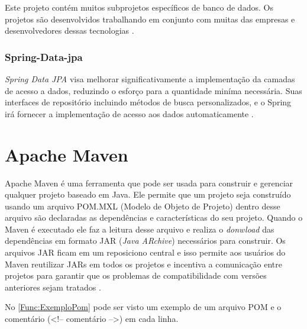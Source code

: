 Este projeto contém muitos subprojetos específicos de banco de dados. Os projetos são desenvolvidos trabalhando em conjunto com muitas das empresas e desenvolvedores dessas tecnologias \cite{springData:2017}.


\subsubsection{Spring-Data-jpa}\label{subsubsec:SpringDatajpa}

\textit{Spring Data JPA} visa melhorar significativamente a implementação da camadas de acesso a dados, reduzindo o esforço para a quantidade miníma necessária. Suas interfaces de repositório incluindo métodos de busca personalizados, e o Spring irá fornecer a implementação de acesso aos dados automaticamente \cite{springDataJpa:2017}.



\section{Apache Maven}\label{sec:ApacheMaven}

Apache Maven é uma ferramenta que pode ser usada para construir e gerenciar qualquer projeto baseado em Java. Ele permite que um projeto seja construído usando um arquivo POM.MXL (Modelo de Objeto de Projeto) dentro desse arquivo são declaradas as dependências e características do seu projeto. Quando o Maven é executado ele faz a leitura desse arquivo e realiza o \textit{donwload} das dependências em formato JAR (\textit{Java ARchive}) necessários para construir. Os arquivos JAR ficam em um reposiciono central e isso permite aos usuários do Maven reutilizar JARs em todos os projetos e incentiva a comunicação entre projetos para garantir que os problemas de compatibilidade com versões anteriores sejam tratados \cite{ApacheFeature:2017}.


No \autoref{Func:ExemploPom} pode ser visto um exemplo de um arquivo POM e o comentário (<!-- comentário -->) em cada linha.

